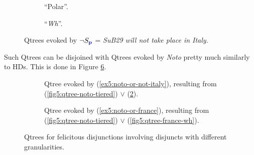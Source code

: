 \begin{figure}[H]
	\centering
	\begin{subfigure}[b]{.45\linewidth}
		\centering
		\caption[]{``Polar''.}\label{fig5:qtree-not-italy-polar}
	\end{subfigure}\hfill
	\begin{subfigure}[b]{.45\linewidth}
		\centering
		\caption[]{``\textit{Wh}''.}\label{fig5:qtree-not-italy-wh}
	\end{subfigure}
	\caption[]{Qtrees evoked by $\neg S_{\textbf{\textcolor{blue}{p}}}$ = \textit{SuB29 will not take place in Italy}.}\label{fig5:qtrees-not-italy}
\end{figure}
Such Qtrees can be disjoined with Qtrees evoked by \textit{Noto} pretty much similarly to HDs. This is done in Figure \ref{fig5:qtrees-diff-gran}.

\begin{figure}[H]
	\centering
	\begin{subfigure}[b]{.45\linewidth}
		\centering
		\caption[]{Qtree evoked by (\ref{ex5:noto-or-not-italy}), resulting from (\ref{fig5:qtree-noto-tiered}) $\vee$ (\ref{fig5:qtree-not-italy-wh}).}
		\label{fig5:qtree-noto-or-not-italy}
	\end{subfigure}\hfill
	\begin{subfigure}[b]{.45\linewidth}
		\centering
		\caption[]{Qtree evoked by (\ref{ex5:noto-or-france}), resulting from (\ref{fig5:qtree-noto-tiered}) $\vee$ (\ref{fig5:qtree-france-wh}).}
		\label{fig5:qtree-noto-or-france}
	\end{subfigure}
	\caption[]{Qtrees for felicitous disjunctions involving disjuncts with different granularities.}\label{fig5:qtrees-diff-gran}
\end{figure}


